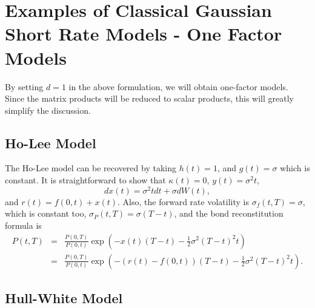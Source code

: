 \documentclass[12pt]{article}
\begin{document}
\section{Examples of Classical Gaussian Short Rate Models - One Factor Models}

  By setting $d=1$ in the above formulation, we will obtain one-factor models. Since the matrix products will be reduced to
  scalar products, this will greatly simplify the discussion.

  \subsection{Ho-Lee Model}

  The Ho-Lee model can be recovered by taking $h(t)=1$, and $g(t)=\sigma$ which is constant. It is straightforward to show that
  $\kappa(t)=0$, $y(t)=\sigma^2t$,
  \begin{equation}
    dx(t)=\sigma^2tdt+\sigma dW(t),
  \end{equation}
  and $r(t)=f(0,t)+x(t)$. Also, the forward rate volatility is $\sigma_f(t,T)=\sigma$, which is constant too, $\sigma_P(t,T)=\sigma(T-t)$, and the bond
  reconstitution formula is
  \begin{eqnarray}
    P(t,T)&=&\frac{P(0,T)}{P(0,t)}\exp\left(-x(t)(T-t)-\frac{1}{2}\sigma^2(T-t)^2t\right)\nonumber\\
          &=&\frac{P(0,T)}{P(0,t)}\exp\left(-\left(r(t)-f(0,t)\right)(T-t)-\frac{1}{2}\sigma^2(T-t)^2t\right).
  \end{eqnarray}


  \subsection{Hull-White Model}
\end{document}
